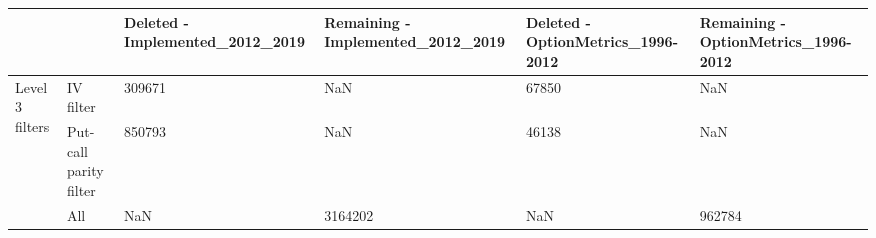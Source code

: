 \begin{tabular}{llllll}
\toprule
 &  & Deleted - Implemented_2012_2019 & Remaining - Implemented_2012_2019 & Deleted - OptionMetrics_1996-2012 & Remaining - OptionMetrics_1996-2012 \\
\midrule
\multirow[t]{3}{*}{Level 3 filters} & IV filter & 309671 & NaN & 67850 & NaN \\
 & Put-call parity filter & 850793 & NaN & 46138 & NaN \\
 & All & NaN & 3164202 & NaN & 962784 \\
\cline{1-6}
\bottomrule
\end{tabular}
